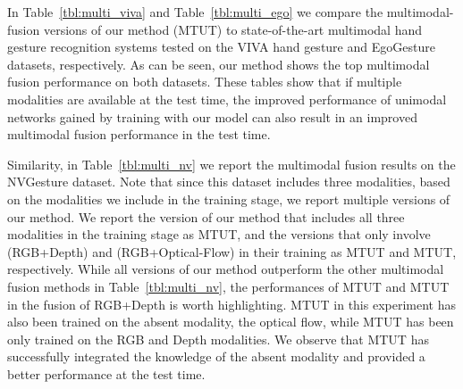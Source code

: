 \documentclass[10pt,twocolumn,letterpaper]{article}
\begin{document}
In Table~\ref{tbl:multi_viva} and  Table~\ref{tbl:multi_ego} we compare the multimodal-fusion versions of our method (MTUT) to state-of-the-art multimodal hand gesture recognition systems tested on the VIVA hand gesture and EgoGesture datasets, respectively.   As can be seen, our method shows the top multimodal fusion performance on both datasets. These tables show that if multiple modalities are available at the test time, the improved performance of unimodal networks gained by training with our model can also result in an improved multimodal fusion performance in the test time. 

Similarity, in Table~\ref{tbl:multi_nv} we report the multimodal fusion results on the NVGesture dataset. Note that since this dataset includes three modalities, based on the modalities we include in the training stage, we report multiple versions of our method.  We report the version of our method that includes all three modalities in the training stage as MTUT, and the versions that only involve (RGB+Depth) and (RGB+Optical-Flow) in their training as MTUT and MTUT, respectively.    While all versions of our method outperform the other multimodal fusion methods in Table~\ref{tbl:multi_nv}, the performances of MTUT and MTUT in the fusion of RGB+Depth is worth highlighting.   MTUT in this experiment has also been trained on the absent modality, the optical flow, while MTUT has been only trained on the RGB and Depth modalities. We observe that MTUT has successfully integrated the knowledge of the absent modality and provided a better performance at the test time.  








\begin{table}[t]
\begin{center}
\vspace{0.5mm}
\caption{Accuracies of different multimodal fusion-based  hand gesture methods on the VIVA dataset~\cite{ohn2014hand}. The top performer is denoted by boldface.} \label{tbl:multi_viva}
\end{center}
\vspace{-5mm}
\end{table}
\end{document}
